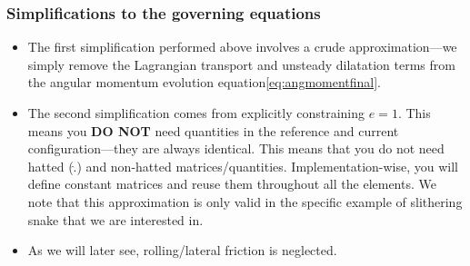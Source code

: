 \documentclass[11pt]{article}
\begin{document}
\subsubsection{Simplifications to the governing equations}
\label{sec:org6a93b43}
\begin{itemize}
\item The first simplification performed above involves a crude
approximation---we simply remove the Lagrangian transport and unsteady
dilatation terms from the angular momentum evolution equation\cref{eq:angmomentfinal}.
\item The second simplification comes from explicitly constraining \(e = 1\).
This means you \textbf{DO NOT} need quantities in the reference and current
configuration---they are always identical. This means that you do not
need hatted (\(\hat{.}\)) and non-hatted matrices/quantities.
Implementation-wise, you will define constant matrices and reuse them
throughout all the elements. We note that this approximation is only
valid in the specific example of slithering snake that we are interested in.
\item As we will later see, rolling/lateral friction is neglected.
\end{itemize}
\end{document}
